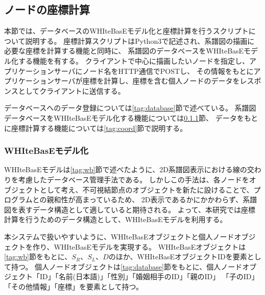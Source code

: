 \subsection{ノードの座標計算}\label{tag:backend}
本節では、データベースのWHIteBasEモデル化と座標計算を行うスクリプトについて説明する。
座標計算スクリプトはPython3で記述され、系譜図の描画に必要な座標を計算する機能と同時に、
系譜図のデータベースをWHIteBasEモデル化する機能を有する。
クライアントで中心に描画したいノードを指定し、アプリケーションサーバにノード名をHTTP通信でPOSTし、
その情報をもとにアプリケーションサーバが座標を計算し、座標を含む個人ノードのデータをレスポンスとしてクライアントに送信する。

データベースへのデータ登録については\ref{tag:database}節で述べている。
系譜図データベースをWHIteBasEモデル化する機能については\ref{tag:wbModel}節、
データをもとに座標計算する機能については\ref{tag:coord}節で説明する。

\subsubsection{WHIteBasEモデル化}\label{tag:wbModel}
WHIteBasEモデルは\ref{tag:wb}節で述べたように、2D系譜図表示における線の交わりを考慮したデータベース管理手法である。
しかしこの手法は、各ノードをオブジェクトとして考え、不可視結節点のオブジェクトを新たに設けることで、プログラムとの親和性が高まっているため、
2D表示であるかにかかわらず、系譜図を表すデータ構造として適していると期待される。
よって、本研究では座標計算を行うためのデータ構造として、WHIteBasEモデルを利用する。

本システムで扱いやすいように、WHIteBasEオブジェクトと個人ノードオブジェクトを作り、WHIteBasEモデルを実現する。
WHIteBasEオブジェクトは\ref{tag:wb}節をもとに、$S_R$、$S_L$、$D$のほか、WHIteBasEオブジェクトIDを要素として持つ。
個人ノードオブジェクトは\ref{tag:database}節をもとに、個人ノードオブジェクト「ID」「名前(日本語)」「性別」「婚姻相手のID」「親のID」
「子のID」「その他情報」「座標」を要素として持つ。

